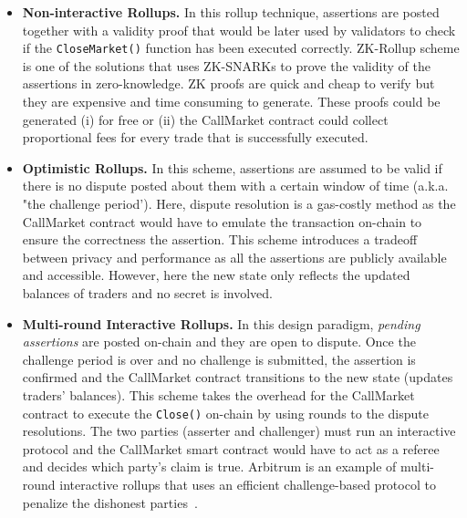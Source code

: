 \begin{itemize}
\begin{itemize}
\begin{itemize}
\item \textbf{{Non-interactive Rollups.}} In this rollup technique, assertions are posted together with a validity proof that would be later used by validators to check if the \texttt{CloseMarket()} function has been executed correctly. ZK-Rollup scheme is one of the solutions that uses ZK-SNARKs to prove the validity of the assertions in zero-knowledge. ZK proofs are quick and cheap to verify but they are expensive and time consuming to generate. These proofs could be generated (i) for free or (ii) the CallMarket contract could collect proportional fees for every trade that is successfully executed.

\item \textbf{{Optimistic Rollups.}} In this scheme, assertions are assumed to be valid if there is no dispute posted about them with a certain window of time (a.k.a. "the challenge period'). Here, dispute resolution is a gas-costly method as the CallMarket contract would have to emulate the transaction on-chain to ensure the correctness the assertion. This scheme introduces a tradeoff between privacy and performance as all the assertions are publicly available and accessible. However, here the new state only reflects the updated balances of traders and no secret is involved. 

\item \textbf {{Multi-round Interactive Rollups.}} In this design paradigm, \textit{pending assertions} are posted on-chain and they are open to dispute. Once the challenge period is over and no challenge is submitted, the assertion is confirmed and the CallMarket contract transitions to the new state (\ie updates traders' balances). This scheme takes the overhead for the CallMarket contract to execute the \texttt{Close()} on-chain by using rounds to the dispute resolutions. The two parties (asserter and challenger) must run an interactive protocol and the CallMarket smart contract would have to act as a referee and decides which party's claim is true. Arbitrum is an example of multi-round interactive rollups that uses an efficient challenge-based protocol to penalize the dishonest parties~\cite{kalodner2018arbitrum}. 

\end{itemize}



\end{itemize}
\end{itemize}

